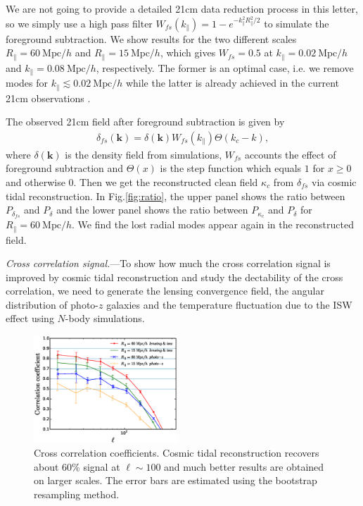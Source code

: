 \documentclass[aps,prl,twocolumn,showpacs,superscriptaddress,groupedaddress,nofootinbib]{revtex4}  %
\newcommand{\mr}{\mathrm}
\begin{document}
We are not going to provide a detailed 21cm data reduction process in this 
letter, so we simply  use a high pass filter 
$W_{fs}(k_\parallel)=1-e^{-k_\parallel^2R_\parallel^2/2}$ to simulate the 
foreground subtraction. We show results for the two different scales 
$R_\parallel=60\ \mr{Mpc}/h$ and $R_\parallel=15\ \mr{Mpc}/h$, which gives
$W_{fs}=0.5$ at $k_\parallel=0.02\ \mr{Mpc}/h$ and 
$k_\parallel=0.08\ \mr{Mpc}/h$, respectively. The former is an optimal case, 
i.e. we remove modes for $k_\parallel\lesssim0.02\ \mr{Mpc}/h$ while the latter
is already achieved in the current 21cm observations 
\cite{2013ApJ...763L..20M}\cite{2013MNRAS.434L..46S}.

The observed 21cm field after foreground subtraction is given by 
\begin{eqnarray}
\delta_{fs}(\bm{k})=\delta(\bm{k})W_{fs}(k_\parallel)\Theta(k_c-k),
\end{eqnarray}
where $\delta(\bm{k})$ is the density field from simulations, $W_{fs}$ accounts
the effect of foreground subtraction and $\Theta(x)$ is the step function 
which equals $1$ for $x\ge0$ and otherwise $0$.
Then we get the reconstructed clean field $\kappa_c$ from $\delta_{fs}$ via
cosmic tidal reconstruction. In Fig.\ref{fig:ratio}, the upper panel shows the 
ratio between $P_{\delta_{fs}}$ and $P_{\delta}$ and the lower panel shows the
ratio between $P_{\kappa_c}$ and $P_\delta$ for $R_\parallel=60\ \mr{Mpc}/h$. 
We find the lost radial modes appear again in the reconstructed field.

{\it Cross correlation signal.}---To show how much the cross correlation signal
is improved by cosmic tidal reconstruction and study the dectability of the
cross correlation, we need to generate the lensing convergence field,
the angular distribution of photo-$z$ galaxies and the temperature fluctuation
due to the ISW effect using $N$-body simulations.

\begin{figure}[tbp]
\begin{center}
\includegraphics[width=0.48\textwidth]{fig1b.eps}
\end{center}
\vspace{-0.7cm}
\caption{Cross correlation coefficients. Cosmic tidal reconstruction recovers 
about 60\% signal at $\ell\sim100$ and much better results are obtained on 
larger scales. The error bars are estimated using the bootstrap resampling 
method.}
\label{fig:cc}
\end{figure}
\end{document}
